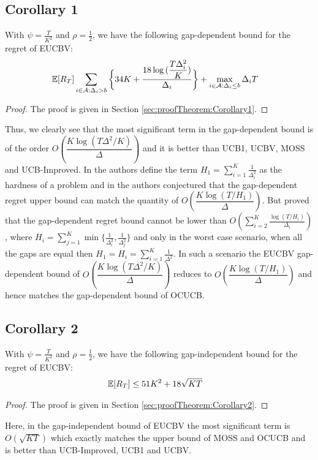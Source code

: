 \subsection{Corollary 1}
\begin{corollary}
\label{Result:Corollary:1}
With $\psi=\frac{T}{K^2}$ and $\rho=\frac{1}{2}$, we have the following gap-dependent bound for the regret of EUCBV:
\begin{align*}
\mathbb{E} [R_T] & \sum_{i\in \mathcal{A}:\Delta_{i} > b}\bigg\lbrace 34 K + \dfrac{18\log{(\dfrac{T\Delta_{i}^{2}}{ K})}}{\Delta_{i}}\bigg\rbrace 
 + \max\limits_{i\in \mathcal{A}:\Delta_{i}\leq b}\Delta_{i}T 
	\end{align*} 
\end{corollary}
\begin{proof}
The proof is given in Section \ref{sec:proofTheorem:Corollary1}.
\end{proof}
Thus, we clearly see that the most significant term in the gap-dependent bound is of the order $O\left(\dfrac{K\log{(T\Delta^{2}/K)}}{\Delta}\right)$ and it is better than UCB1, UCBV, MOSS and UCB-Improved. In \citet{audibert2010best} the authors define the term $H_1=\sum_{i=1}^{K}\frac{1}{\Delta_i^2}$ as the hardness of a problem and in \citet{bubeck2012regret} the authors conjectured that the gap-dependent regret upper bound can match the quantity of $O\left(\dfrac{K\log{(T/H_1)}}{\Delta}\right)$. But \citet{lattimore2015optimally} proved that the gap-dependent regret bound cannot be lower than $O\left(\sum_{i=2}^{K}\frac{\log\left(T/H_i\right)}{\Delta_i}\right)$, where $H_i=\sum_{j=1}^{K}\min\lbrace \frac{1}{\Delta_i^2},\frac{1}{\Delta_j^2}\rbrace$ and only in the worst case scenario, when all the gaps are equal then $H_1=H_{i}=\sum_{i=1}^{K}\frac{1}{\Delta^2}$. In such a scenario the EUCBV gap-dependent bound of $O\left(\dfrac{K\log{(T\Delta^{2}/ K)}}{\Delta}\right)$ reduces to $O\left(\dfrac{K\log{(T/H_1)}}{\Delta}\right)$ and hence matches the gap-dependent bound of OCUCB.

\subsection{Corollary 2}

\begin{corollary}
\label{Result:Corollary:2}
With $\psi=\frac{T}{K^2}$ and $\rho=\frac{1}{2}$, we have the following gap-independent bound for the regret of EUCBV:
\begin{align*}
\mathbb{E}[R_{T}] & \leq 51 K^2 + 18\sqrt{KT}
	\end{align*} 
\end{corollary}
\begin{proof}
The proof is given in Section \ref{sec:proofTheorem:Corollary2}.
\end{proof}
Here, in the gap-independent bound of EUCBV the most significant term is $O\left(\sqrt{KT}\right)$ which exactly matches the upper bound of MOSS and OCUCB and is better than UCB-Improved, UCB1 and UCBV.